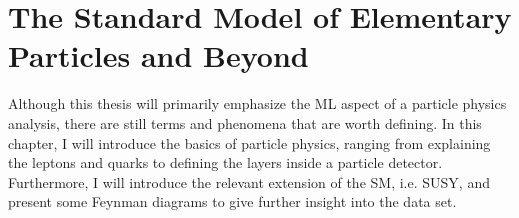 \chapter{The Standard Model of Elementary Particles and Beyond}
Although this thesis will primarily emphasize the \ac{ML} aspect of a particle physics analysis, there are still terms and phenomena that are 
worth defining. In this chapter, I will introduce the basics of particle physics, ranging from explaining the leptons and quarks to defining 
the layers inside a particle detector. Furthermore, I will introduce the relevant extension of the \ac{SM}, i.e. \acf{SUSY}, and present some 
Feynman diagrams to give further insight into the data set.